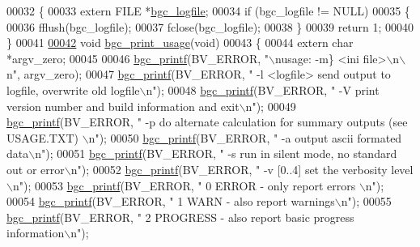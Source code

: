 \begin{DoxyCode}
{00032 \{
00033     \textcolor{keyword}{extern} FILE *\hyperlink{bgc__io_8c_a176fee5c0e3671a626cd8ec7d1cc1be8}{bgc\_logfile};
00034     \textcolor{keywordflow}{if} (bgc\_logfile != NULL)
00035     \{
00036         fflush(bgc\_logfile);
00037         fclose(bgc\_logfile);
00038     \}
00039     \textcolor{keywordflow}{return} 1;
00040 \}
00041 
\hypertarget{bgc__io_8c_source_l00042}{}\hyperlink{bgc__io_8c_adcf0cce6fdd3c3d3531f826bede8bb66}{00042} \textcolor{keywordtype}{void} \hyperlink{bgc__io_8c_adcf0cce6fdd3c3d3531f826bede8bb66}{bgc\_print\_usage}(\textcolor{keywordtype}{void})
00043 \{
00044     \textcolor{keyword}{extern} \textcolor{keywordtype}{char} *argv\_zero;
00045 
00046     \hyperlink{bgc__io_8c_af287cce6e2aede1ce337de9319e80d0d}{bgc\_printf}(BV\_ERROR, \textcolor{stringliteral}{"\(\backslash\)nusage: %
       -m\} <ini file>\(\backslash\)n\(\backslash\)n"}, argv\_zero);
00047     \hyperlink{bgc__io_8c_af287cce6e2aede1ce337de9319e80d0d}{bgc\_printf}(BV\_ERROR, \textcolor{stringliteral}{"       -l <logfile> send output to logfile, overwrite old logfile\(\backslash\)n"}); 
00048     \hyperlink{bgc__io_8c_af287cce6e2aede1ce337de9319e80d0d}{bgc\_printf}(BV\_ERROR, \textcolor{stringliteral}{"       -V print version number and build information and exit\(\backslash\)n"});
00049     \hyperlink{bgc__io_8c_af287cce6e2aede1ce337de9319e80d0d}{bgc\_printf}(BV\_ERROR, \textcolor{stringliteral}{"       -p do alternate calculation for summary outputs (see USAGE.TXT)
      \(\backslash\)n"});
00050     \hyperlink{bgc__io_8c_af287cce6e2aede1ce337de9319e80d0d}{bgc\_printf}(BV\_ERROR, \textcolor{stringliteral}{"       -a output ascii formated data\(\backslash\)n"});
00051     \hyperlink{bgc__io_8c_af287cce6e2aede1ce337de9319e80d0d}{bgc\_printf}(BV\_ERROR, \textcolor{stringliteral}{"       -s run in silent mode, no standard out or error\(\backslash\)n"});
00052     \hyperlink{bgc__io_8c_af287cce6e2aede1ce337de9319e80d0d}{bgc\_printf}(BV\_ERROR, \textcolor{stringliteral}{"       -v [0..4] set the verbosity level \(\backslash\)n"});
00053     \hyperlink{bgc__io_8c_af287cce6e2aede1ce337de9319e80d0d}{bgc\_printf}(BV\_ERROR, \textcolor{stringliteral}{"           0 ERROR - only report errors \(\backslash\)n"});
00054     \hyperlink{bgc__io_8c_af287cce6e2aede1ce337de9319e80d0d}{bgc\_printf}(BV\_ERROR, \textcolor{stringliteral}{"           1 WARN - also report warnings\(\backslash\)n"});
00055     \hyperlink{bgc__io_8c_af287cce6e2aede1ce337de9319e80d0d}{bgc\_printf}(BV\_ERROR, \textcolor{stringliteral}{"           2 PROGRESS - also report basic progress information\(\backslash\)n"});
}
\end{DoxyCode}
